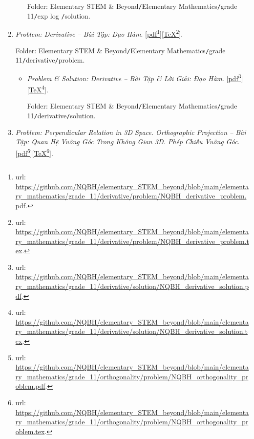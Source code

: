 \documentclass[12pt,oneside]{book}
\begin{document}
\begin{enumerate}
\begin{itemize}
		Folder: {\sf Elementary STEM \& Beyond{\tt/}Elementary Mathematics{\tt/}grade 11{\tt/}exp log {\tt/}solution}.
	\end{itemize}
	\item {\it Problem: Derivative -- Bài Tập: Đạo Hàm}. [\href{https://github.com/NQBH/elementary_STEM_beyond/blob/main/elementary_mathematics/grade_11/derivative/problem/NQBH_derivative_problem.pdf}{pdf}\footnote{{\sc url}: \url{https://github.com/NQBH/elementary_STEM_beyond/blob/main/elementary_mathematics/grade_11/derivative/problem/NQBH_derivative_problem.pdf}.}][\href{https://github.com/NQBH/elementary_STEM_beyond/blob/main/elementary_mathematics/grade_11/derivative/problem/NQBH_derivative_problem.tex}{\TeX}\footnote{{\sc url}: \url{https://github.com/NQBH/elementary_STEM_beyond/blob/main/elementary_mathematics/grade_11/derivative/problem/NQBH_derivative_problem.tex}.}].
	
	Folder: {\sf Elementary STEM \& Beyond{\tt/}Elementary Mathematics{\tt/}grade 11{\tt/}derivative{\tt/}problem}.
	\begin{itemize}
		\item {\it Problem \& Solution: Derivative -- Bài Tập \& Lời Giải: Đạo Hàm}. [\href{https://github.com/NQBH/elementary_STEM_beyond/blob/main/elementary_mathematics/grade_11/derivative/solution/NQBH_derivative_solution.pdf}{pdf}\footnote{{\sc url}: \url{https://github.com/NQBH/elementary_STEM_beyond/blob/main/elementary_mathematics/grade_11/derivative/solution/NQBH_derivative_solution.pdf}.}][\href{https://github.com/NQBH/elementary_STEM_beyond/blob/main/elementary_mathematics/grade_11/derivative/solution/NQBH_derivative_solution.tex}{\TeX}\footnote{{\sc url}: \url{https://github.com/NQBH/elementary_STEM_beyond/blob/main/elementary_mathematics/grade_11/derivative/solution/NQBH_derivative_solution.tex}.}].
		
		Folder: {\sf Elementary STEM \& Beyond{\tt/}Elementary Mathematics{\tt/}grade 11{\tt/}derivative{\tt/}solution}.
	\end{itemize}
	\item {\it Problem: Perpendicular Relation in 3D Space. Orthographic Projection -- Bài Tập: Quan Hệ Vuông Góc Trong Không Gian 3D. Phép Chiếu Vuông Góc}. [\href{https://github.com/NQBH/elementary_STEM_beyond/blob/main/elementary_mathematics/grade_11/orthogonality/problem/NQBH_orthogonality_problem.pdf}{pdf}\footnote{{\sc url}: \url{https://github.com/NQBH/elementary_STEM_beyond/blob/main/elementary_mathematics/grade_11/orthogonality/problem/NQBH_orthogonality_problem.pdf}.}][\href{https://github.com/NQBH/elementary_STEM_beyond/blob/main/elementary_mathematics/grade_11/orthogonality/problem/NQBH_orthogonality_problem.tex}{\TeX}\footnote{{\sc url}: \url{https://github.com/NQBH/elementary_STEM_beyond/blob/main/elementary_mathematics/grade_11/orthogonality/problem/NQBH_orthogonality_problem.tex}.}].
	

\end{enumerate}
\end{document}
